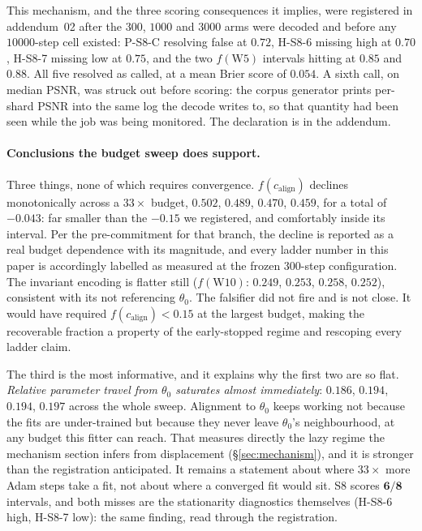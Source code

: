 \documentclass[10pt,twocolumn,letterpaper]{article}
\theoremstyle{definition}
\newcommand{\calign}{c_{\mathrm{align}}}
\begin{document}
This mechanism, and the three scoring consequences it implies, were registered in addendum~02 after
the $300$, $1000$ and $3000$ arms were decoded and before any $10000$-step cell existed: P-S8-C
resolving false at $0.72$, H-S8-6 missing high at $0.70$, H-S8-7 missing low at $0.75$, and the two
$f(\mathrm{W5})$ intervals hitting at $0.85$ and $0.88$. All five resolved as called, at a mean
Brier score of $0.054$. A sixth call, on median PSNR, was struck out
before scoring: the corpus generator prints per-shard PSNR into the same log the decode writes to,
so that quantity had been seen while the job was being monitored. The declaration is in the
addendum.

\paragraph{Conclusions the budget sweep does support.} Three things, none of which requires convergence.
$f(\calign)$ declines monotonically across a $33\times$ budget, $0.502$, $0.489$, $0.470$,
$0.459$, for a total of $\mathbf{-0.043}$: far smaller than the $-0.15$ we registered, and
comfortably inside its interval. Per the pre-commitment for that branch, the decline is reported as a real
budget dependence with its magnitude, and every ladder number in this paper is accordingly labelled
as measured at the frozen $300$-step configuration. The invariant encoding is flatter still
($f(\mathrm{W10})$: $0.249$, $0.253$, $0.258$, $0.252$), consistent with its not referencing
$\theta_0$. The falsifier did not fire and is not close. It would have required $f(\calign) < 0.15$ at the
largest budget, making the recoverable fraction a property of the early-stopped regime and
rescoping every ladder claim.

The third is the most informative, and it explains why the first two are so flat. \emph{Relative
parameter travel from $\theta_0$ saturates almost immediately}: $0.186$, $0.194$, $0.194$, $0.197$
across the whole sweep. Alignment to $\theta_0$ keeps working not because the fits are
under-trained but because they never leave $\theta_0$'s neighbourhood, at any budget this fitter
can reach. That measures directly the lazy regime the mechanism section infers from displacement
(\S\ref{sec:mechanism}), and it is stronger than the registration anticipated. It remains a
statement about where $33\times$ more Adam steps take a fit, not about where a converged fit would
sit. S8 scores $\mathbf{6/8}$ intervals, and both misses are the stationarity diagnostics
themselves (H-S8-6 high, H-S8-7 low): the same finding, read through the registration.
\end{document}
